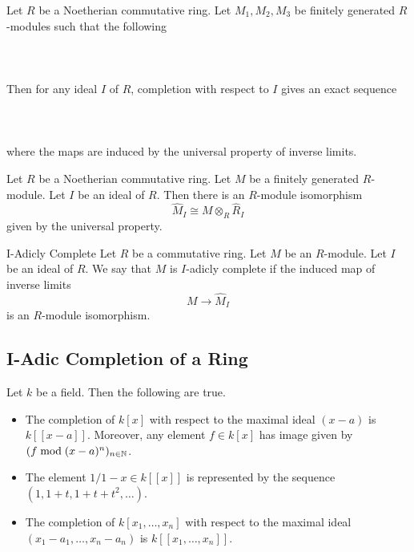 \documentclass[a4paper]{article}
\begin{document}
\begin{prp}{}{} Let $R$ be a Noetherian commutative ring. Let $M_1,M_2,M_3$ be finitely generated $R$-modules such that the following \\~\\
 \\~\\
Then for any ideal $I$ of $R$, completion with respect to $I$ gives an exact sequence \\~\\
 \\~\\
where the maps are induced by the universal property of inverse limits. 
\end{prp}

\begin{prp}{}{} Let $R$ be a Noetherian commutative ring. Let $M$ be a finitely generated $R$-module. Let $I$ be an ideal of $R$. Then there is an $R$-module isomorphism $$\widehat{M}_I\cong M\otimes_R\widehat{R}_I$$ given by the universal property. 
\end{prp}

\begin{defn}{I-Adicly Complete}{} Let $R$ be a commutative ring. Let $M$ be an $R$-module. Let $I$ be an ideal of $R$. We say that $M$ is $I$-adicly complete if the induced map of inverse limits $$M\to\widehat{M}_I$$ is an $R$-module isomorphism. 
\end{defn}

\subsection{I-Adic Completion of a Ring}
\begin{eg}{}{} Let $k$ be a field. Then the following are true. 
\begin{itemize}
\item The completion of $k[x]$ with respect to the maximal ideal $(x-a)$ is $k[[x-a]]$. Moreover, any element $f\in k[x]$ has image given by $(f\bmod (x-a)^n)_{n\in\mathbb{N}}$. 
\item The element $1/1-x\in k[[x]]$ is represented by the sequence $(1,1+t,1+t+t^2,\dots)$. 
\item The completion of $k[x_1,\dots,x_n]$ with respect to the maximal ideal $(x_1-a_1,\dots,x_n-a_n)$ is $k[[x_1,\dots,x_n]]$. 
\end{itemize}
\end{eg}
\end{document}
